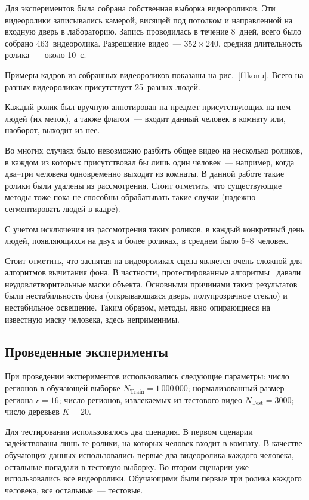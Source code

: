 \begin{multicols}{2}
Для экспериментов была собрана собственная выборка видеороликов. Эти видеоролики 
записывались камерой, висящей под потолком и на\-прав\-лен\-ной на входную дверь в лабораторию. 
Запись проводилась в течение 8~дней, всего было собрано 463~видеоролика. Разрешение
 видео~--- $352 \times 240$, средняя длительность ролика~--- около 10~с. 

Примеры кадров из собранных видеороликов показаны на рис.~\ref{f1konu}. Всего на разных 
видеороликах присутствует 25~разных людей.

Каждый ролик был вручную аннотирован на предмет присутствующих на нем людей (их меток), 
а также флагом~--- входит данный человек в комнату или, наоборот, выходит из нее.



Во многих случаях было невозможно разбить общее видео на несколько роликов, в каждом из 
которых присутствовал бы лишь один человек~--- например, когда два--три человека 
одновременно выходят из комнаты. В данной работе такие ролики были удалены из 
рассмотрения. Стоит отметить, что существующие методы тоже пока не способны обрабатывать 
такие случаи (надежно сегментировать людей в кадре).

С учетом исключения из рассмотрения таких роликов, в каждый конкретный день людей, 
появляющихся на двух и более роликах, в среднем было 5--8~человек.

Стоит отметить, что заснятая на видеороликах сцена является очень сложной для алгоритмов 
вычитания фона. В частности, протестированные алгоритмы~\cite{7konu, 6konu} давали 
неудовлетворительные маски объекта. Основными причинами таких результатов были 
нестабильность фона (открывающаяся дверь, полупрозрачное стекло) и нестабильное освещение. 
Таким образом, методы, явно опирающиеся на известную маску человека, здесь неприменимы.

\subsection{Проведенные эксперименты}

При проведении экспериментов использовались следующие параметры: число регионов в 
обуча\-ющей выборке $N_{\mathrm{Train}} =1\,000\,000$; нормализованный размер региона $r=16$; число 
регионов, извлекаемых из тестового видео $N_{\mathrm{Test}}=3000$; число деревьев $K=20$.

Для тестирования использовалось два сценария. В первом сценарии задействованы лишь те 
ролики, на которых человек входит в комнату. В качестве обучающих данных использовались 
первые два видеоролика каждого человека, остальные попадали в тестовую выборку. Во втором 
сценарии уже использовались все видеоролики. Обучающими были первые три ролика каждого 
человека, все остальные~--- тестовые.


\end{multicols}
